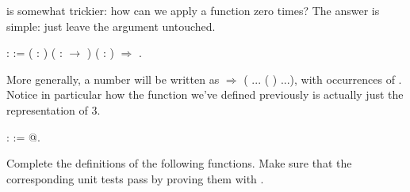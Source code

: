 \documentclass[12pt]{report}
\begin{document}
 is somewhat trickier: how can we apply a function zero
    times? The answer is simple: just leave the argument untouched. \begin{coqdoccode}
\coqdocemptyline
\coqdocnoindent
{}  :  :=\coqdoceol
\coqdocindent{1.00em}
 ( : ) ( :  \ensuremath{\rightarrow} ) ( : ) \ensuremath{\Rightarrow} .\coqdoceol
\coqdocemptyline
\end{coqdoccode}
More generally, a number  will be written as     \ensuremath{\Rightarrow}  (
    ... ( ) ...), with  occurrences of . Notice in particular
    how the  function we've defined previously is actually
    just the representation of 3. \begin{coqdoccode}
\coqdocemptyline
\coqdocnoindent
{}  :  := @.\coqdoceol
\coqdocemptyline
\end{coqdoccode}
Complete the definitions of the following functions. Make sure
    that the corresponding unit tests pass by proving them with
    . 
\end{document}
